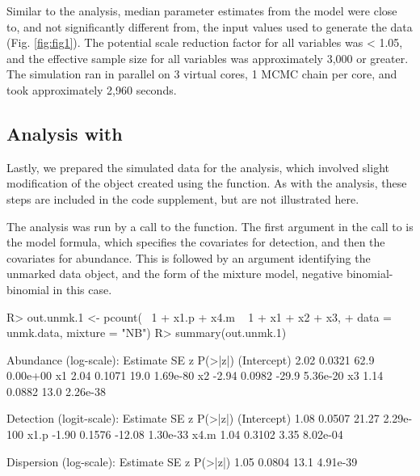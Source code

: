 \documentclass[codesnippet]{jss}
\begin{document}
Similar to the  analysis, median parameter estimates from the 
 model were close to, and not significantly different from, 
the input values used to generate the data (Fig. \ref{fig:fig1}). The 
potential scale reduction factor for all variables was < 1.05, and the 
effective sample size for all variables was approximately 3,000 or greater. 
The simulation ran in parallel on 3 virtual cores, 1 MCMC chain per core, 
and took approximately 2,960 seconds.

\subsection[Analysis with unmarked]{Analysis with }
Lastly, we prepared the simulated data for the  analysis, 
which involved slight modification of the  object created 
using the  function. As with the  analysis, 
these steps are included in the code supplement, but are not illustrated 
here.

The  analysis was run by a call to the  
function. The first argument in the call to  is the model 
formula, which specifies the covariates for detection, and then the 
covariates for abundance. This is followed by an argument identifying the 
unmarked data object, and the form of the mixture model, negative 
binomial-binomial in this case.

\begin{CodeInput}
R> out.unmk.1 <- pcount(~ 1 + x1.p + x4.m ~ 1 + x1 + x2 + x3,
+    data = unmk.data, mixture = "NB")
R> summary(out.unmk.1)
\end{CodeInput}

\begin{CodeOutput}
Abundance (log-scale):
            Estimate       SE       z     P(>|z|)
(Intercept)     2.02   0.0321    62.9    0.00e+00
x1              2.04   0.1071    19.0    1.69e-80
x2             -2.94   0.0982   -29.9    5.36e-20
x3              1.14   0.0882    13.0    2.26e-38

Detection (logit-scale):
            Estimate       SE       z     P(>|z|)
(Intercept)     1.08   0.0507   21.27   2.29e-100
x1.p           -1.90   0.1576  -12.08    1.30e-33
x4.m            1.04   0.3102    3.35    8.02e-04

Dispersion (log-scale):
Estimate          SE     z    P(>|z|)
1.05          0.0804  13.1   4.91e-39
\end{CodeOutput}
\end{document}
